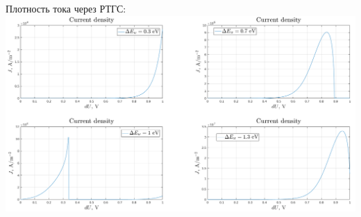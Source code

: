 \documentclass[10pt,pdf,hyperref={unicode},aspectratio={169}]{beamer}
\begin{document}
\begin{frame}
\begin{columns}
		{\color{red} Плотность тока через РТГС:}\\
	   	\includegraphics[width=.8\linewidth,center]{assets/qwhj}
	\end{columns}
\end{frame}
\end{document}
